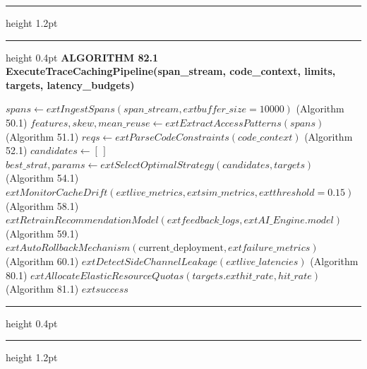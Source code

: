 \documentclass[11pt,a4paper]{article}
\newenvironment{textbookalgo}[2]{%
  \par\addvspace{1.2em}\noindent
  \hrule height 1.2pt
  \vspace{1.5pt}
  \hrule height 0.4pt
  \vspace{5pt}
  {\noindent\large\bfseries\sffamily ALGORITHM #1 \quad #2}
  \par\vspace{5pt}
  \RestyleAlgo{plain}
}{%
  \par\vspace{4pt}
  \hrule height 0.4pt
  \vspace{1.5pt}
  \hrule height 1.2pt
  \par\addvspace{1.2em}
}
\theoremstyle{definition}
\begin{document}
\begin{textbookalgo}{82.1}{ExecuteTraceCachingPipeline(span\_stream, code\_context, limits, targets, latency\_budgets)}
\begin{algorithm}[H]
$spans \leftarrow 	ext{IngestSpans}(span\_stream, 	ext{buffer\_size}=10000)$ \hfill (Algorithm 50.1)\;
$features, skew, mean\_reuse \leftarrow 	ext{ExtractAccessPatterns}(spans)$ \hfill (Algorithm 51.1)\;
$reqs \leftarrow 	ext{ParseCodeConstraints}(code\_context)$ \hfill (Algorithm 52.1)\;
$candidates \leftarrow [\,]$\;
$best\_strat, params \leftarrow 	ext{SelectOptimalStrategy}(candidates, targets)$ \hfill (Algorithm 54.1)\;
$	ext{MonitorCacheDrift}(	ext{live\_metrics}, 	ext{sim\_metrics}, 	ext{threshold}=0.15)$ \hfill (Algorithm 58.1)\;
$	ext{RetrainRecommendationModel}(	ext{feedback\_logs}, 	ext{AI\_Engine.model})$ \hfill (Algorithm 59.1)\;
$	ext{AutoRollbackMechanism}(\text{current\_deployment}, 	ext{failure\_metrics})$ \hfill (Algorithm 60.1)\;
$	ext{DetectSideChannelLeakage}(	ext{live\_latencies})$ \hfill (Algorithm 80.1)\;
$	ext{AllocateElasticResourceQuotas}(targets.	ext{hit\_rate}, hit\_rate)$ \hfill (Algorithm 81.1)\;
\Return $	ext{success}$\;
\end{algorithm}
\end{textbookalgo}
\end{document}
